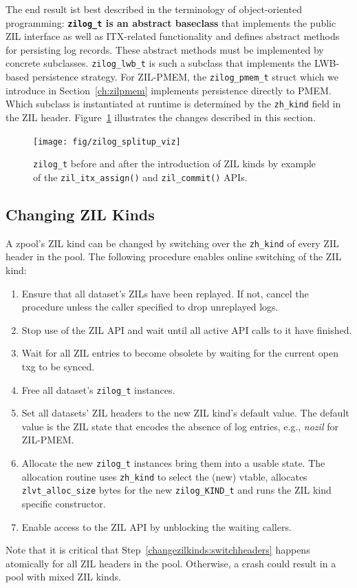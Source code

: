 \documentclass[12pt,a4paper,twoside]{book}
\begin{document}
The end result ist best described in the terminology of object-oriented programming:
\textbf{\lstinline{zilog_t} is an abstract baseclass} that implements the public ZIL interface as well as ITX-related functionality and defines abstract methods for persisting log records.
These abstract methods must be implemented by concrete subclasses.
\lstinline{zilog_lwb_t} is such a subclass that implements the LWB-based persistence strategy.
For ZIL-PMEM, the \lstinline{zilog_pmem_t} struct which we introduce in Section~\ref{ch:zilpmem} implements persistence directly to PMEM.
Which subclass is instantiated at runtime is determined by the \lstinline{zh_kind} field in the ZIL header.
Figure~\ref{fig:zilog_splitup_viz} illustrates the changes described in this section.

\begin{figure}[H]
\texttt{[image: fig/zilog\_splitup\_viz]}
\caption{\lstinline{zilog_t} before and after the introduction of ZIL kinds by example of the \lstinline{zil_itx_assign()} and \lstinline{zil_commit()} APIs.}
\label{fig:zilog_splitup_viz}
\end{figure}

\subsection{Changing ZIL Kinds}\label{sec:zil_kinds:change}
A zpool's ZIL kind can be changed by switching over the \lstinline{zh_kind} of every ZIL header in the pool.
The following procedure enables online switching of the ZIL kind:
\begin{enumerate}[noitemsep]
    \item Ensure that all dataset's ZILs have been replayed. If not, cancel the procedure unless the caller specified to drop unreplayed logs.
    \item Stop use of the ZIL API and wait until all active API calls to it have finished.
    \item Wait for all ZIL entries to become obsolete by waiting for the current open txg to be synced.
    \item Free all dataset's \lstinline{zilog_t} instances.
    \item \label{changezilkinds:switchheaders} Set all datasets' ZIL headers to the new ZIL kind's default value.
        The default value is the ZIL state that encodes the absence of log entries, e.g., \textit{nozil} for ZIL-PMEM.
    \item Allocate the new \lstinline{zilog_t} instances bring them into a usable state.
        The allocation routine uses \lstinline{zh_kind} to select the (new) vtable, allocates \lstinline{zlvt_alloc_size} bytes for the new \lstinline{zilog_KIND_t} and runs the ZIL kind specific constructor.
    \item Enable access to the ZIL API by unblocking the waiting callers.
\end{enumerate}
Note that it is critical that Step~\ref{changezilkinds:switchheaders} happens atomically for all ZIL headers in the pool.
Otherwise, a crash could result in a pool with mixed ZIL kinds.
\end{document}
